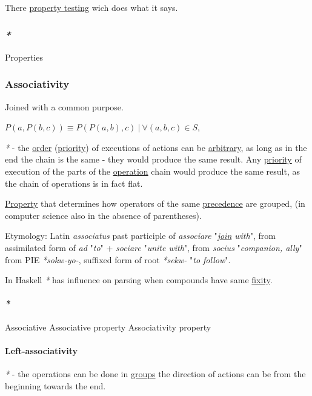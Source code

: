 \documentclass[a4paper,14pt,oneside]{book}
\begin{document}
There \hyperref[org9ac8ff6]{property testing} wich does what it says.

\subsubsection{\emph{*}}
\label{sec:org15e71b4}

\label{org0be48bd}Properties

\subsubsection{\label{org8bc908f}Associativity}
\label{sec:org095c1f4}
Joined with a common purpose.

\(P(a,P(b,c)) \equiv P(P(a,b),c) \ | \ \forall (a,b,c) \in S\),

\emph{*} - the \hyperref[org346af6d]{order} (\hyperref[org364b507]{priority}) of executions of actions can be \hyperref[org4807485]{arbitrary}, as long as in the end the chain is the same - they would produce the same result.
Any \hyperref[org364b507]{priority} of execution of the parts of the \hyperref[org284a47b]{operation} chain would produce the same result, as the chain of operations is in fact flat.

\hyperref[orgc961e31]{Property} that determines how operators of the same \hyperref[org891d5f6]{precedence} are grouped, (in computer science also in the absence of parentheses).

Etymology:
Latin \emph{associatus} past participle of \emph{associare} "\emph{\hyperref[orgc467c38]{join} with}", from assimilated form of \emph{ad} "\emph{to}" + \emph{sociare} "\emph{unite with}", from \emph{socius} "\emph{companion, ally}" from PIE \emph{*sokw-yo-}, suffixed form of root \emph{*sekw-} "\emph{to follow}".

In Haskell \emph{*} has influence on parsing when compounds have same \hyperref[org926e100]{fixity}.

\paragraph{\emph{*}}
\label{sec:org8fc7a8f}

\label{org5d2a9b6}Associative
\label{orgcc21e16}Associative property
\label{org97aded7}Associativity property

\paragraph{\label{org0880e16}Left-associativity}
\label{sec:orgd536654}
\emph{*} - the operations can be done in \hyperref[org3b930d2]{groups} the direction of actions can be from the beginning towards the end.
\end{document}
